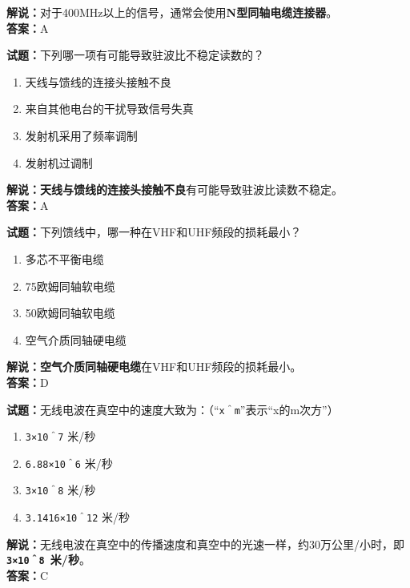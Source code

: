 \documentclass{ctexbook}
\begin{document}
\noindent\textbf{解说：}对于400MHz以上的信号，通常会使用\textbf{N型同轴电缆连接器}。\\\noindent\textbf{答案：}A


\bigskip


\noindent\textbf{试题：}下列哪一项有可能导致驻波比不稳定读数的？

\begin{enumerate}[leftmargin=3em]
	\item 天线与馈线的连接头接触不良
	\item 来自其他电台的干扰导致信号失真
	\item 发射机采用了频率调制
	\item 发射机过调制
\end{enumerate}

\noindent\textbf{解说：}\textbf{天线与馈线的连接头接触不良}有可能导致驻波比读数不稳定。\\\noindent\textbf{答案：}A


\bigskip


\noindent\textbf{试题：}下列馈线中，哪一种在VHF和UHF频段的损耗最小？

\begin{enumerate}[leftmargin=3em]
	\item 多芯不平衡电缆
	\item 75欧姆同轴软电缆
	\item 50欧姆同轴软电缆
	\item 空气介质同轴硬电缆
\end{enumerate}

\noindent\textbf{解说：}\textbf{空气介质同轴硬电缆}在VHF和UHF频段的损耗最小。\\\noindent\textbf{答案：}D


\bigskip


\noindent\textbf{试题：}无线电波在真空中的速度大致为：（“\texttt{x＾m}”表示“x的m次方”）

\begin{enumerate}[leftmargin=3em]
	\item \texttt{3×10＾7} 米/秒
	\item \texttt{6.88×10＾6} 米/秒
	\item \texttt{3×10＾8} 米/秒
	\item \texttt{3.1416×10＾12} 米/秒
\end{enumerate}

\noindent\textbf{解说：}无线电波在真空中的传播速度和真空中的光速一样，约30万公里/小时，即\textbf{\texttt{3×10＾8 }米/秒}。\\\noindent\textbf{答案：}C
\end{document}
